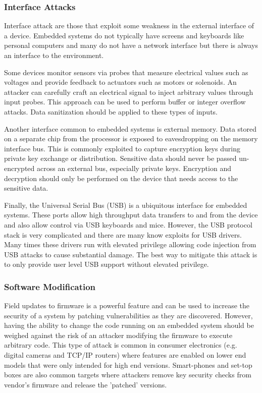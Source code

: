 \documentclass[final,conference,10pt]{IEEEtran}
\begin{document}
\subsubsection{Interface Attacks}
Interface attack are those that exploit some weakness in the external interface of a device.  Embedded systems do not typically have screens and keyboards like personal computers and many do not have a network interface but there is always an interface to the environment.  

Some devices monitor sensors via probes that measure electrical values such as voltages and provide feedback to actuators such as motors or solenoids. An attacker can carefully craft an electrical signal to inject arbitrary values through input probes.  This approach can be used to perform buffer or integer overflow attacks.  Data sanitization should be applied to these types of inputs.\cite{Jyostna2011} 

Another interface common to embedded systems is external memory.  Data stored on a separate chip from the processor is exposed to eavesdropping on the memory interface bus.  This is commonly exploited to capture encryption keys during private key exchange or distribution.  Sensitive data should never be passed un-encrypted across an external bus, especially private keys.  Encryption and decryption should only be performed on the device that needs access to the sensitive data.\cite{off chip memory}

Finally, the Universal Serial Bus (USB) is a ubiquitous interface for embedded systems.  These ports allow high throughput data transfers to and from the device and also allow control via USB keyboards and mice.  However, the USB protocol stack is very complicated and there are many know exploits for USB drivers.  Many times these drivers run with elevated privilege allowing code injection from USB attacks to cause substantial damage.  The best way to mitigate this attack is to only provide user level USB support without elevated privilege. \cite{USB}

\subsubsection{Software Modification}
Field updates to firmware is a powerful feature and can be used to increase the security of a system by patching vulnerabilities as they are discovered.  However, having the ability to change the code running on an embedded system should be weighed against the risk of an attacker modifying the firmware to execute arbitrary code. This type of attack is common in consumer electronics (e.g. digital cameras and TCP/IP routers)  where features are enabled on lower end models that were only intended for high end versions.  Smart-phones and set-top boxes are also common targets where attackers remove key security checks from vendor's firmware and release the 'patched' versions.
\end{document}
